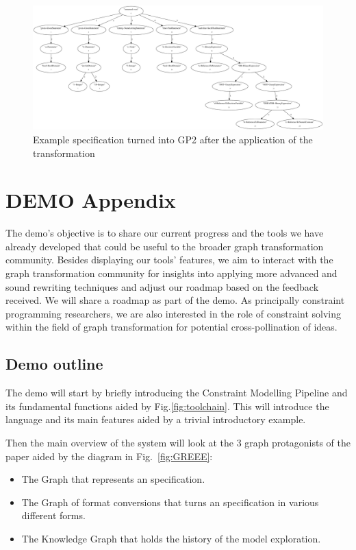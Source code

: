 \begin{figure}[htb]
\begin{center}
\includegraphics[angle=90,height=0.9\textheight,width=\textwidth]{demorg-AFTER.pdf}
\caption{Example specification turned into GP2 after the application of the transformation}
\end{center}
\label{fig:demorg-AFTER}
\end{figure}


\clearpage
\section{DEMO Appendix}


The demo's objective is to share our current progress and the tools we have already developed that could be useful to the broader graph transformation community.
Besides displaying our tools' features, we aim to interact with the graph transformation community for insights into applying more advanced and sound rewriting techniques and adjust our roadmap based on the feedback received. We will share a roadmap as part of the demo.
As principally constraint programming researchers, we are also interested in the role of constraint solving within the field of graph transformation for potential cross-pollination of ideas.

\subsection{Demo outline}

The demo will start by briefly introducing the Constraint Modelling Pipeline and its fundamental functions aided by Fig.\ref{fig:toolchain}. This will introduce the \essence language and its main features aided by a trivial introductory example.

Then the main overview of the system will look at the 3 graph protagonists of the paper aided by the diagram in Fig.~\ref{fig:GREEE}:
\begin{itemize}
    \item The Graph that represents an \essence specification.
    \item The Graph of format conversions that turns an \essence specification in various different forms.
    \item The Knowledge Graph that holds the history of the model exploration.
\end{itemize}

